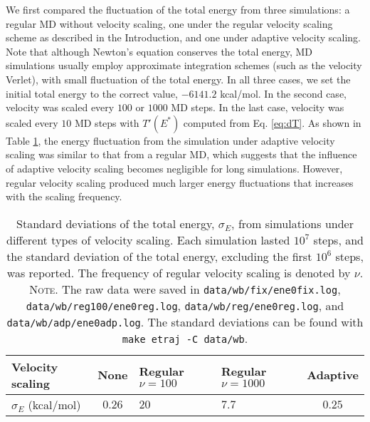 \documentclass[reprint]{revtex4-1}
\newcommand{\note}[1]{{\color{DarkGreen}\footnotesize \textsc{Note.} #1}}
\begin{document}
We first compared the fluctuation of the total energy
from three simulations:
%
a regular MD without velocity scaling,
one under the regular velocity scaling scheme as described in the Introduction,
and one under adaptive velocity scaling.
%
Note that although Newton's equation conserves the total energy,
MD simulations usually employ approximate integration schemes
(such as the velocity Verlet),
with
small fluctuation of the total energy.
%
In all three cases,
we set the initial total energy to the correct value, $-6141.2$ kcal/mol.
%
In the second case,
velocity was scaled every $100$ or $1000$ MD steps.
%
In the last case,
velocity was scaled every $10$ MD steps with
$T'(E^*)$ computed from Eq. \eqref{eq:dT}.
%
As shown in Table \ref{tab:etraj},
the energy fluctuation from the simulation under adaptive velocity scaling
was similar to that from a regular MD,
which suggests that the influence of adaptive velocity scaling
becomes negligible for long simulations.
%
However, regular velocity scaling
produced much larger energy fluctuations
that increases with the scaling frequency.

\begin{table}[h]
  \setlength{\tabcolsep}{5pt}
  \renewcommand{\arraystretch}{1.5}
  \begin{center}
    \begin{tabular}{ p{2.5cm} | c p{1.3cm} p{1.3cm} c }
      \hline
      Velocity scaling
      &   None    &   Regular \newline $\nu =100 $   & Regular \newline $\nu = 1000$  &   Adaptive \\
      \hline
      $\sigma_E$ (kcal/mol)
      &   $0.26$  &   $20$    &  $7.7$     &   $0.25$ \\
      \hline
    \end{tabular}
  \end{center}
  \caption{
    \label{tab:etraj}
    Standard deviations of the total energy, $\sigma_E$,
    from simulations under different types of velocity scaling.
    Each simulation lasted $10^7$ steps,
    and the standard deviation of the total energy,
    excluding the first $10^6$ steps, was reported.
    The frequency of regular velocity scaling
    is denoted by $\nu$.
    \note{
      The raw data were saved in
      \texttt{data/wb/fix/ene0fix.log},
      \texttt{data/wb/reg100/ene0reg.log},
      \texttt{data/wb/reg/ene0reg.log},
      and
      \texttt{data/wb/adp/ene0adp.log}.
      The standard deviations can be found with
      \texttt{make etraj -C data/wb}.
    }%
  }
\end{table}
\end{document}
